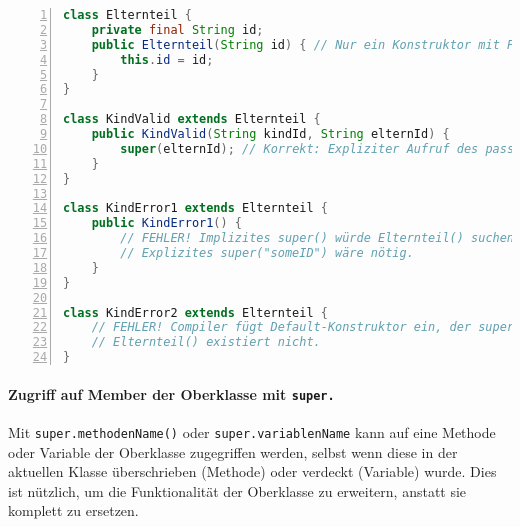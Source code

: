 \begin{lstlisting}[language=Java, caption={Kompilierfehler: \texttt{super()}-Aufruf scheitert bei parametrisiertem Superkonstruktor}, 
    label=lst:super_fehler, basicstyle=\ttfamily\footnotesize, breaklines=true, frame=tb, numbers=left]
class Elternteil {
    private final String id;
    public Elternteil(String id) { // Nur ein Konstruktor mit Parameter
        this.id = id;
    }
}

class KindValid extends Elternteil {
    public KindValid(String kindId, String elternId) {
        super(elternId); // Korrekt: Expliziter Aufruf des passenden Konstruktors
    }
}

class KindError1 extends Elternteil {
    public KindError1() {
        // FEHLER! Implizites super() würde Elternteil() suchen, gibt es aber nicht.
        // Explizites super("someID") wäre nötig.
    }
}

class KindError2 extends Elternteil {
    // FEHLER! Compiler fügt Default-Konstruktor ein, der super() aufruft.
    // Elternteil() existiert nicht.
}
\end{lstlisting}

\paragraph{Zugriff auf Member der Oberklasse mit \texttt{super.}}
Mit \texttt{super.methodenName()} oder \texttt{super.variablenName} kann auf eine Methode oder Variable der Oberklasse zugegriffen werden, 
selbst wenn diese in der aktuellen Klasse überschrieben (Methode) oder verdeckt (Variable) wurde. Dies ist nützlich, um die Funktionalität 
der Oberklasse zu erweitern, anstatt sie komplett zu ersetzen.

